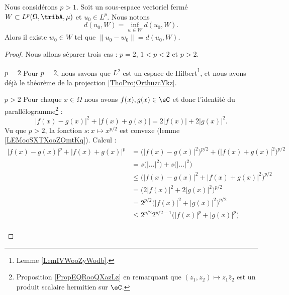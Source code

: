 \begin{theorem} \label{THOooRJFUooQivDKm}
    Nous considérons \( p>1\). Soit un sous-espace vectoriel fermé \( W\subset L^p(\Omega,\tribA,\mu)\) et \( u_0\in L^p\). Nous notons
    \begin{equation}
        d(u_0,W)=\inf_{w\in W}d(u_0,W).
    \end{equation}
    Alors il existe \( w_0\in W\) tel que \( \| u_0-w_0 \|=d(u_0,W)\).
\end{theorem}

\begin{proof}
    Nous allons séparer trois cas : \( p=2\), \( 1<p<2\) et \( p>2\). 
    \begin{subproof}
        \item[\( p=2\)]
            Pour \( p=2\), nous savons que \( L^2\) est un espace de Hilbert\footnote{Lemme \ref{LemIVWooZyWodb}.}, et nous avons déjà le théorème de la projection \ref{ThoProjOrthuzcYkz}.
        \item[\( p>2\)]
            Pour chaque \( x\in \Omega\) nous avons \( f(x), g(x)\in \eC\) et donc l'identité du parallélogramme\footnote{Proposition \ref{PropEQRooQXazLz} en remarquant que $(z_1,z_2)\mapsto z_1\bar z_2$ est un produit scalaire hermitien sur $\eC$.} :
            \begin{equation}        \label{EQooUBFEooDUjLnb}
                \big| f(x)-g(x) \big|^2+\big| f(x)+g(x) \big|=2| f(x) |+2| g(x) |^2.
            \end{equation}
            Vu que \( p>2\), la fonction \( s\colon x\mapsto  x^{p/2}\) est convexe (lemme \ref{LEMooSXTXooZOmtKq}). Calcul :
            \begin{subequations}
                \begin{align}
                    | f(x)-g(x) |^p+| f(x)+g(x) |^p&=\big( | f(x)-g(x) |^2 \big)^{p/2}+\big( | f(x)+g(x) |^2 \big)^{p/2}\\
                    &=s\big( | \ldots |^2 \big)+s\big( | \ldots |^2 \big)\\
                    &\leq \big( | f(x)-g(x) |^2+| f(x)+g(x) |^2 \big)^{p/2}     \label{SUBEQooRHAEooHkYNLH}\\
                    &=\big( 2| f(x) |^2+2| g(x) |^2 \big)^{p/2}                 \label{SUBEQooQFSLooJkoeqN}\\
                    &=2^{p/2}\big( | f(x) |^2+| g(x) |^2 \big)^{p/2}\\
                    &\leq  2^{p/2}2^{p/2-1}\big( | f(x) |^p+| g(x) |^p \big)     \label{SUBEQooQSUHooXKaWwO}\\

\end{align}
\end{subequations}
\end{subproof}
\end{proof}
